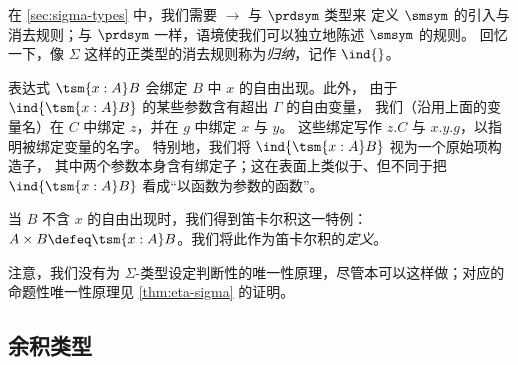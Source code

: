 在 \cref{sec:sigma-types} 中，我们需要 $\to$ 与 $\prdsym$ 类型来
定义 $\smsym$ 的引入与消去规则；与 $\prdsym$ 一样，语境使我们可以独立地陈述 $\smsym$ 的规则。
回忆一下，像 $\Sigma$ 这样的正类型的消去规则称为\emph{归纳}，记作 $\ind{}$。
%
%
表达式 $\tsm{x:A} B$ 会绑定 $B$ 中 $x$ 的自由出现。此外，
由于 $\ind{\tsm{x:A} B}$ 的某些参数含有超出 $\Gamma$ 的自由变量，
我们（沿用上面的变量名）在 $C$ 中绑定 $z$，并在 $g$ 中绑定 $x$ 与 $y$。
这些绑定写作 $z.C$ 与 $x.y.g$，以指明被绑定变量的名字。
%
特别地，我们将 $\ind{\tsm{x:A} B}$ 视为一个原始项构造子，
其中两个参数本身含有绑定子；这在表面上类似于、但不同于把 $\ind{\tsm{x:A} B}$ 看成“以函数为参数的函数”。

当 $B$ 不含 $x$ 的自由出现时，我们得到笛卡尔积这一特例：
$A \times B \defeq \tsm{x:A} B$。我们将此作为笛卡尔积的\emph{定义}。

注意，我们没有为 $\Sigma$-类型设定判断性的唯一性原理，尽管本可以这样做；对应的命题性唯一性原理见 \cref{thm:eta-sigma} 的证明。

\subsection{余积类型}

